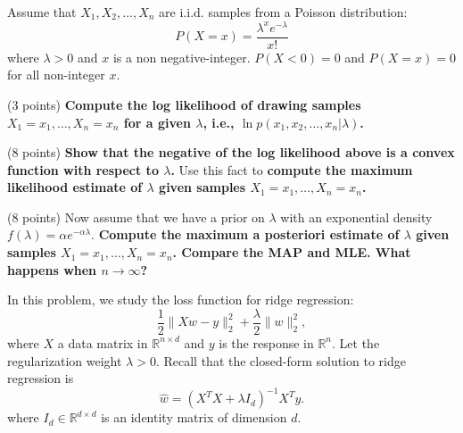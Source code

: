 Assume that $X_1, X_2, ..., X_n$ are i.i.d. samples from a Poisson distribution:
$$P(X=x) = \frac{\lambda^x e^{-\lambda}}{x!}$$
where $\lambda > 0$ and $x$ is a non negative-integer. $P(X<0) = 0$
and $P(X = x) = 0$ for all non-integer $x$. 
\begin{Parts}
\Part (3 points) \textbf{Compute the log likelihood of drawing samples $X_1=x_1,
  \ldots , X_n=x_n$ for a given $\lambda$, i.e., $\ln p(x_1, x_2, \ldots, x_n | \lambda)$.}

\ifexamnosol
\vspace{3in}
\fi


\ifexamnosol
\newpage
\fi
\Part (8 points) \textbf{Show that the negative of the log likelihood above is a convex function with respect to $\lambda$.} Use this fact to \textbf{compute the maximum likelihood estimate of $\lambda$ given samples $X_1=x_1, \ldots, X_n=x_n$.}

\ifexamnosol
\vspace{3in}
\fi


\ifexamnosol
\newpage
\fi
\Part (8 points) Now assume that we have a prior on $\lambda$ with an exponential
density $f(\lambda) = \alpha e^{-\alpha \lambda}$. \textbf{Compute the
  maximum a posteriori estimate of $\lambda$ given samples
  $X_1=x_1,\ldots,X_n=x_n$. Compare the MAP and MLE. What happens when $n \to \infty$?}



\end{Parts}
In this problem, we study the loss function for ridge regression:
\begin{equation} \label{eq:ridge}
\frac 1 2 {\|Xw-y\|_2^2}+\frac \lambda 2 \|w\|_2^2,
\end{equation}
where $X$ a data matrix in $\mathbb R^{n\times d}$ and $y$ is the
response in $\mathbb R^n$. Let the regularization weight $\lambda > 0$. 
Recall that the closed-form solution to ridge regression is
\begin{equation}
\hat{w} = (X^TX+\lambda I_d)^{-1}X^Ty.
\end{equation}
where $I_d \in \mathbb{R}^{d \times d}$ is an identity matrix of dimension $d$.


